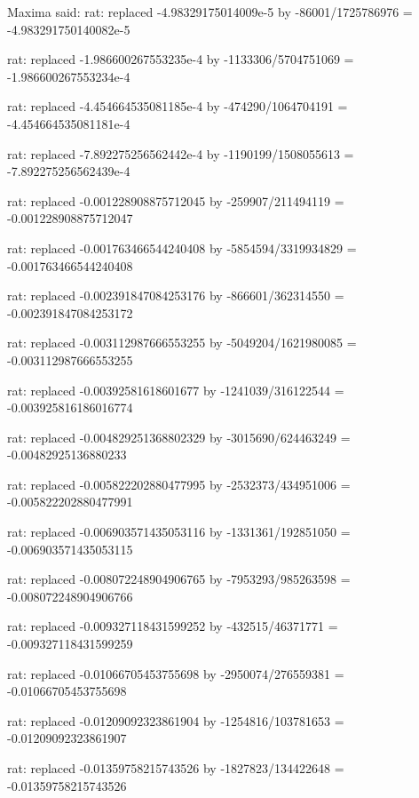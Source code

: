 \documentclass[a4paper,10pt]{article}
\begin{document}
\begin{eulernotebook}
\begin{eulercomment}
\begin{eulercomment}
\begin{eulercomment}
\begin{eulercomment}
\begin{eulercomment}
\begin{eulercomment}
\begin{eulercomment}
\begin{eulercomment}
\begin{eulercomment}
\begin{eulercomment}
\begin{eulercomment}
\begin{eulercomment}
\begin{eulercomment}
\begin{eulercomment}
\begin{eulercomment}
\begin{eulercomment}
\begin{euleroutput}
                                [1, 1, 3]
  
\end{euleroutput}
\begin{euleroutput}
  Maxima said:
  rat: replaced -4.98329175014009e-5 by -86001/1725786976 = -4.983291750140082e-5
  
  rat: replaced -1.986600267553235e-4 by -1133306/5704751069 = -1.986600267553234e-4
  
  rat: replaced -4.454664535081185e-4 by -474290/1064704191 = -4.454664535081181e-4
  
  rat: replaced -7.892275256562442e-4 by -1190199/1508055613 = -7.892275256562439e-4
  
  rat: replaced -0.001228908875712045 by -259907/211494119 = -0.001228908875712047
  
  rat: replaced -0.001763466544240408 by -5854594/3319934829 = -0.001763466544240408
  
  rat: replaced -0.002391847084253176 by -866601/362314550 = -0.002391847084253172
  
  rat: replaced -0.003112987666553255 by -5049204/1621980085 = -0.003112987666553255
  
  rat: replaced -0.00392581618601677 by -1241039/316122544 = -0.003925816186016774
  
  rat: replaced -0.004829251368802329 by -3015690/624463249 = -0.00482925136880233
  
  rat: replaced -0.005822202880477995 by -2532373/434951006 = -0.005822202880477991
  
  rat: replaced -0.006903571435053116 by -1331361/192851050 = -0.006903571435053115
  
  rat: replaced -0.008072248904906765 by -7953293/985263598 = -0.008072248904906766
  
  rat: replaced -0.009327118431599252 by -432515/46371771 = -0.009327118431599259
  
  rat: replaced -0.01066705453755698 by -2950074/276559381 = -0.01066705453755698
  
  rat: replaced -0.01209092323861904 by -1254816/103781653 = -0.01209092323861907
  
  rat: replaced -0.01359758215743526 by -1827823/134422648 = -0.01359758215743526
  

\end{euleroutput}
\end{eulercomment}
\end{eulercomment}
\end{eulercomment}
\end{eulercomment}
\end{eulercomment}
\end{eulercomment}
\end{eulercomment}
\end{eulercomment}
\end{eulercomment}
\end{eulercomment}
\end{eulercomment}
\end{eulercomment}
\end{eulercomment}
\end{eulercomment}
\end{eulercomment}
\end{eulercomment}
\end{eulernotebook}
\end{document}
